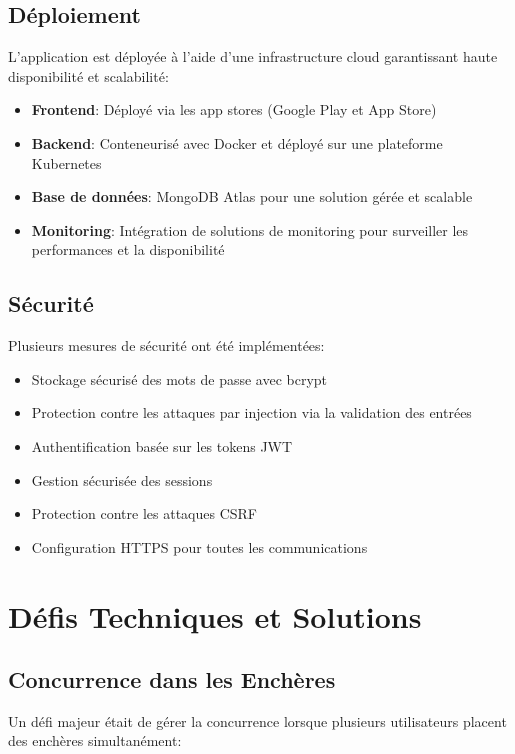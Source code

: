 \subsection{Déploiement}
L'application est déployée à l'aide d'une infrastructure cloud garantissant haute disponibilité et scalabilité:

\begin{itemize}
    \item \textbf{Frontend}: Déployé via les app stores (Google Play et App Store)
    \item \textbf{Backend}: Conteneurisé avec Docker et déployé sur une plateforme Kubernetes
    \item \textbf{Base de données}: MongoDB Atlas pour une solution gérée et scalable
    \item \textbf{Monitoring}: Intégration de solutions de monitoring pour surveiller les performances et la disponibilité
\end{itemize}

\subsection{Sécurité}
Plusieurs mesures de sécurité ont été implémentées:

\begin{itemize}
    \item Stockage sécurisé des mots de passe avec bcrypt
    \item Protection contre les attaques par injection via la validation des entrées
    \item Authentification basée sur les tokens JWT
    \item Gestion sécurisée des sessions
    \item Protection contre les attaques CSRF
    \item Configuration HTTPS pour toutes les communications
\end{itemize}

\section{Défis Techniques et Solutions}

\subsection{Concurrence dans les Enchères}
Un défi majeur était de gérer la concurrence lorsque plusieurs utilisateurs placent des enchères simultanément:

